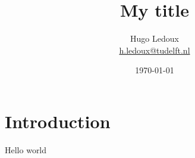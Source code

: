 \documentclass{article}
\title{My title}
\author{Hugo Ledoux\\ \url{h.ledoux@tudelft.nl}}
\date{\today}
\begin{document}
\maketitle

%
\section{Introduction}

Hello world
\end{document}
